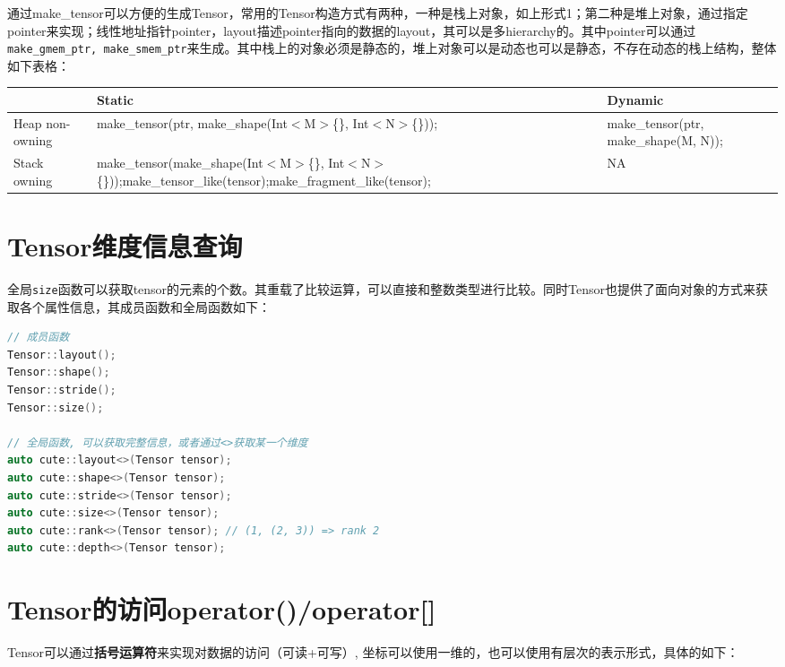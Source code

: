 通过make\_tensor可以方便的生成Tensor，常用的Tensor构造方式有两种，一种是栈上对象，如上形式1；第二种是堆上对象，通过指定pointer来实现；线性地址指针pointer，layout描述pointer指向的数据的layout，其可以是多hierarchy的。其中pointer可以通过\verb|make_gmem_ptr, make_smem_ptr|来生成。其中栈上的对象必须是静态的，堆上对象可以是动态也可以是静态，不存在动态的栈上结构，整体如下表格：

\begin{center}\small
\begin{tabular}{p{}p{}p{}}
\toprule
 & Static & Dynamic \\
\midrule
Heap non-owning & make\_tensor(ptr, make\_shape(Int$<$M$>$\{\}, Int$<$N$>$\{\})); & make\_tensor(ptr, make\_shape(M, N)); \\
Stack owning & make\_tensor(make\_shape(Int$<$M$>$\{\}, Int$<$N$>$\{\}));\allowbreak make\_tensor\_like(tensor);\allowbreak make\_fragment\_like(tensor); & NA \\
\bottomrule
\end{tabular}
\end{center}

\section{Tensor维度信息查询}

全局\verb|size|函数可以获取tensor的元素的个数。其重载了比较运算，可以直接和整数类型进行比较。同时Tensor也提供了面向对象的方式来获取各个属性信息，其成员函数和全局函数如下：

\begin{lstlisting}[language=C++]
// 成员函数
Tensor::layout();
Tensor::shape();
Tensor::stride();
Tensor::size();

// 全局函数, 可以获取完整信息，或者通过<>获取某一个维度
auto cute::layout<>(Tensor tensor);
auto cute::shape<>(Tensor tensor);
auto cute::stride<>(Tensor tensor);
auto cute::size<>(Tensor tensor);
auto cute::rank<>(Tensor tensor); // (1, (2, 3)) => rank 2
auto cute::depth<>(Tensor tensor);
\end{lstlisting}

\section{Tensor的访问operator()/operator[]}

Tensor可以通过\textbf{括号运算符}来实现对数据的访问（可读+可写）, 坐标可以使用一维的，也可以使用有层次的表示形式，具体的如下：

